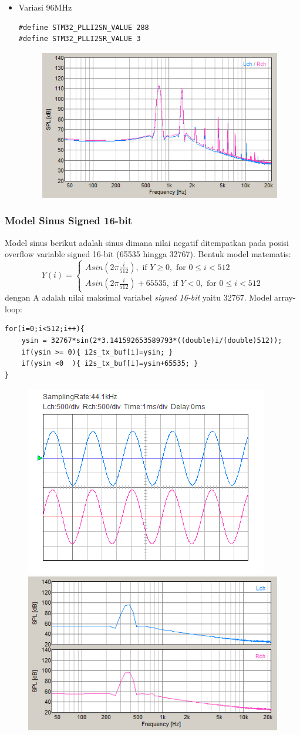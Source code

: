 \documentclass[12pt,]{article}
\begin{document}
\begin{itemize}
  		\item Variasi 96MHz
  		\begin{verbatim}
#define STM32_PLLI2SN_VALUE 288
#define STM32_PLLI2SR_VALUE 3
  		\end{verbatim}
  		\begin{figure}[H]
  			\centering
  			\includegraphics[width=0.45\linewidth]{result/day_2/sine_clk96}
  		\end{figure}
  	\end{itemize}
  
  	\newpage
  	\subsubsection{Model Sinus Signed 16-bit}
  	Model sinus berikut adalah sinus dimana nilai negatif ditempatkan
  	pada posisi overflow variable signed 16-bit (65535 hingga 32767).
  	Bentuk model matematis:
  	\[
  	Y(i) = 
  	\begin{cases}
  	A sin(2 \pi \frac{i}{512}), \text{ if } Y \geq 0, \text{ for } 0 \leq i < 512\\ 
  	A sin(2 \pi \frac{i}{512})+65535, \text{ if } Y < 0, \text{ for } 0 \leq i < 512
  	\end{cases}
  	\]
  	dengan A adalah nilai maksimal variabel \textit{signed 16-bit} yaitu 32767.
  	Model array-loop: 
  	\begin{verbatim}
for(i=0;i<512;i++){
  	ysin = 32767*sin(2*3.141592653589793*((double)i/(double)512));
  	if(ysin >= 0){ i2s_tx_buf[i]=ysin; }
  	if(ysin <0  ){ i2s_tx_buf[i]=ysin+65535; }
}
  	\end{verbatim}
  	\begin{figure}[H]
  		\centering
  		\includegraphics[width=0.45\linewidth]{result/day_4/newsine400}
  		\includegraphics[width=0.45\linewidth]{result/day_4/newsine400fft}
  	\end{figure}
  
\end{document}
